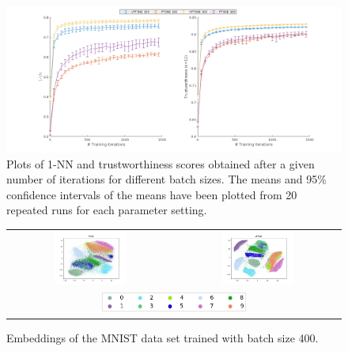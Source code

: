 \begin{figure}[!htb]
  \centering
  \includegraphics[width=\textwidth]{images/learning_curves.png}
  \caption{Plots of 1-NN and trustworthiness scores obtained after a given number of iterations for different batch sizes. The means and 95\% confidence intervals of the means have been plotted from 20 repeated runs for each parameter setting.}
  \label{fig:mnist_knn_trustworthiness}
\end{figure}

\begin{figure}[!htb]
  \centering
  \begin{tabular}{cc}
    \includegraphics[width=0.45\textwidth]{images/mnist_ptsne_embedding.png} &
    \includegraphics[width=0.45\textwidth]{images/mnist_vptsne_embedding.png} \\
    \multicolumn{2}{c}{\includegraphics[width=0.45\textwidth]{images/mnist_legend.png}}
  \end{tabular}
  \caption{Embeddings of the MNIST data set trained with batch size 400.}
  \label{fig:mnist_comparison}
\end{figure}


